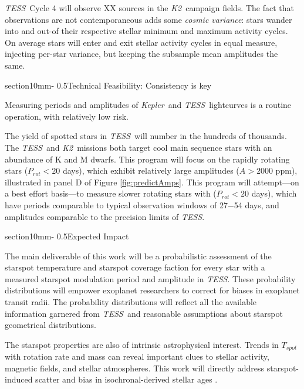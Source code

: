 \documentclass[letterpaper,12pt]{article}
\makeatletter
\renewcommand{\section}{\@startsection%
{section}{1}{0mm}{-\baselineskip}%
{0.5\baselineskip}{\normalfont\Large\bfseries}}%
\newcommand{\tess}{{\it TESS}}
\newcommand{\kepler}{{\it Kepler}}
\newcommand{\ktwo}{{\it K2}}
\makeatother
\begin{document}
\tess\ Cycle 4 will observe XX sources in the \ktwo\ campaign fields.  The fact that observations are not contemporaneous adds some \emph{cosmic variance}: stars wander into and out-of their respective stellar minimum and maximum activity cycles. On average stars will enter and exit stellar activity cycles in equal measure, injecting per-star variance, but keeping the subsample mean amplitudes the same.

\section{Technical Feasibility: Consistency is key}

Measuring periods and amplitudes of \kepler\ and \tess\ lightcurves is a routine operation, with relatively low risk.  

The yield of spotted stars in \tess\ will number in the hundreds of thousands.  The \tess\ and \ktwo\ missions both target cool main sequence stars with an abundance of K and M dwarfs.  This program will focus on the rapidly rotating stars ($P_{rot}<20$ days), which exhibit relatively large amplitudes ($A>2000$ ppm), illustrated in panel D of Figure \ref{fig:predictAmps}.  This program will attempt---on a best effort basis---to measure slower rotating stars with ($P_{rot}<20$ days), which have periods comparable to typical observation windows of 27$-$54 days, and amplitudes comparable to the precision limits of \tess.

\section{Expected Impact}

The main deliverable of this work will be a probabilistic assessment of the starspot temperature and starspot coverage faction for every star with a measured starspot modulation period and amplitude in \tess.  These probability distributions will empower exoplanet researchers to correct for biases in exoplanet transit radii.  The probability distributions will reflect all the available information garnered from \tess\ and reasonable assumptions about starspot geometrical distributions.

The starspot properties are also of intrinsic astrophysical interest.  Trends in $T_{spot}$ with rotation rate and mass can reveal important clues to stellar activity, magnetic fields, and stellar atmospheres.  This work will directly address starspot-induced scatter and bias in isochronal-derived stellar ages \cite{2015ApJ...807..174S, 2017ApJ...836..200G}.
\end{document}
